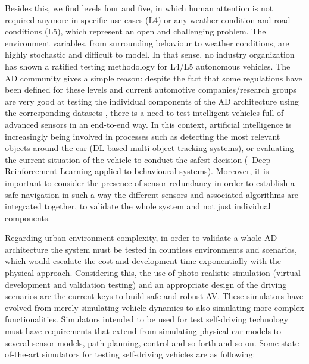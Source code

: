 Besides this, we find levels four and five, in which human attention is not required anymore in specific use cases (L4) or any weather condition and road conditions (L5), which represent an open and challenging problem. The environment variables, from surrounding behaviour to weather conditions, are highly stochastic and difficult to model. In that sense, no industry organization has shown a ratified testing methodology for L4/L5 autonomous vehicles. The \ac{AD} community gives a simple reason: despite the fact that some regulations have been defined for these levels and current automotive companies/research groups are very good at testing the individual components of the AD architecture using the corresponding datasets \cite{geiger2012we} \cite{caesar2020nuscenes, zhan2019interaction}, there is a need to test intelligent vehicles full of advanced sensors \cite{schoner2017role} in an end-to-end way. In this context, artificial intelligence is increasingly being involved in processes such as detecting the most relevant objects around the car (DL based multi-object tracking systems), or evaluating the current situation of the vehicle to conduct the safest decision (\eg \ Deep Reinforcement Learning applied to behavioural systems). Moreover, it is important to consider the presence of sensor redundancy in order to establish a safe navigation in such a way the different sensors and associated algorithms are integrated together, to validate the whole system and not just individual components.

Regarding urban environment complexity, in order to validate a whole AD architecture the system must be tested in countless environments and scenarios, which would escalate the cost and development time exponentially with the physical approach. Considering this, the use of photo-realistic simulation (virtual development and validation testing) and an appropriate design of the driving scenarios are the current keys to build safe and robust AV. These simulators have evolved from merely simulating vehicle dynamics to also simulating more complex functionalities. Simulators intended to be used for test self-driving technology must have requirements that extend from simulating physical car models to several sensor models, path planning, control and so forth and so on. Some state-of-the-art simulators \cite{kaur2021survey} for testing self-driving vehicles are as following:


